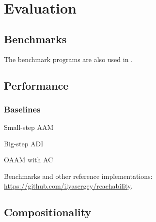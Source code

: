 \section{Evaluation} \label{evaluation}

\subsection{Benchmarks}

The benchmark programs are also used in \cite{Johnson:2013:OAA:2500365.2500604, ashley:practical}.

\subsection{Performance}

\subsubsection{Baselines}
Small-step AAM

Big-step ADI

OAAM with AC \cite{Boucher:1996:ACN:647473.727587, Johnson:2013:OAA:2500365.2500604}

Benchmarks and other reference implementations: \url{https://github.com/ilyasergey/reachability}.

\subsection{Compositionality}

